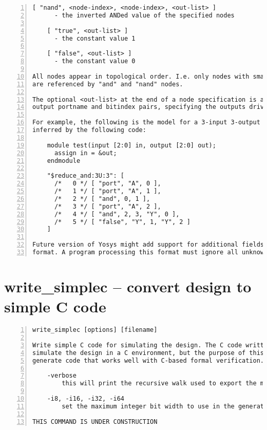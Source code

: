 \begin{lstlisting}[numbers=left,frame=single]
    [ "nand", <node-index>, <node-index>, <out-list> ]
      - the inverted ANDed value of the specified nodes

    [ "true", <out-list> ]
      - the constant value 1

    [ "false", <out-list> ]
      - the constant value 0

All nodes appear in topological order. I.e. only nodes with smaller indices
are referenced by "and" and "nand" nodes.

The optional <out-list> at the end of a node specification is a list of
output portname and bitindex pairs, specifying the outputs driven by this node.

For example, the following is the model for a 3-input 3-output $reduce_and cell
inferred by the following code:

    module test(input [2:0] in, output [2:0] out);
      assign in = &out;
    endmodule

    "$reduce_and:3U:3": [
      /*   0 */ [ "port", "A", 0 ],
      /*   1 */ [ "port", "A", 1 ],
      /*   2 */ [ "and", 0, 1 ],
      /*   3 */ [ "port", "A", 2 ],
      /*   4 */ [ "and", 2, 3, "Y", 0 ],
      /*   5 */ [ "false", "Y", 1, "Y", 2 ]
    ]

Future version of Yosys might add support for additional fields in the JSON
format. A program processing this format must ignore all unknown fields.
\end{lstlisting}

\section{write\_simplec -- convert design to simple C code}
\label{cmd:write_simplec}
\begin{lstlisting}[numbers=left,frame=single]
    write_simplec [options] [filename]

Write simple C code for simulating the design. The C code written can be used to
simulate the design in a C environment, but the purpose of this command is to
generate code that works well with C-based formal verification.

    -verbose
        this will print the recursive walk used to export the modules.

    -i8, -i16, -i32, -i64
        set the maximum integer bit width to use in the generated code.

THIS COMMAND IS UNDER CONSTRUCTION
\end{lstlisting}

